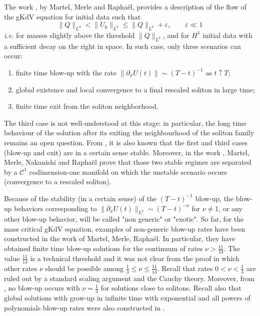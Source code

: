 \documentclass[16pt,english, oneside,reqno]{smfart}
\newcommand{\vare}{{\varepsilon}}
\begin{document}
The work \cite{MMPI}, by  Martel, Merle and Rapha\"el, provides a description of the flow of the gKdV equation for initial data such that
\begin{equation}
    \|Q\|_{L^2} < \|U_0\|_{L^2} \leq \|Q\|_{L^2} + \vare, \qquad \vare \ll1
\end{equation}
\emph{i.e.} for masses slightly above the threshold $\|Q\|_{L^2}$,
and for $H^1$ initial data with a sufficient decay on the right in space.
In such case, only three scenarios can occur: \begin{enumerate}
    \item finite time blow-up with the rate $\|\partial_x U(t)\| \sim (T-t)^{-1}$ as $t \uparrow T$;
    \item global existence and local convergence to a final rescaled soliton in large time;
    \item finite time exit from the soliton neighborhood.
\end{enumerate}
The third case is not well-understood at this stage: in particular,
the long time behaviour of the solution 
after its exiting the neighbourhood of the soliton family remains an open question.
From \cite{MMPI}, it is also known that the first and third cases (blow-up and exit) 
are in a certain sense stable.
Moreover, in the work \cite{Nakanishi-16}, Martel, Merle, Nakanishi and Rapha\"el 
prove that those two stable regimes are separated by a $\mathcal{C}^1$ codimension-one manifold on which the unstable scenario occurs (convergence to a rescaled soliton). 

Because of the stability (in a certain sense) of the $(T-t)^{-1}$ blow-up,
the blow-up behaviors corresponding to $\|\partial_x U(t)\|_{L^2}\sim (T-t)^{-\nu}$ for
$\nu\neq 1$, or any other blow-up behavior, will be called "non generic" or
"exotic".
So far, for the mass critical gKdV equation, examples of non-generic blow-up rates have been constructed in the work \cite{MMPIII} of Martel, Merle, Rapha\"el. 
In particular, they have obtained finite time blow-up solutions for the continuum of rates $\nu>\frac{11}{13}$. The value $\frac{11}{13}$ is a technical threshold and it was not clear from the proof in \cite{MMPII} which other rates $\nu$ should be possible among
$\frac 13 \leq \nu \leq \frac {11}{13}$.
Recall that rates $0<\nu<\frac 13 $ are ruled out by a standard scaling argument and
the Cauchy theory. Moreover, from \cite{Martel-Merle-2002}, 
no blow-up occurs with $\nu =\frac13$ for solutions close to solitons.
Recall also that global solutions with grow-up in infinite time 
with exponential and all powers of polynomials blow-up rates
were also constructed in \cite{MMPIII}.
\end{document}
